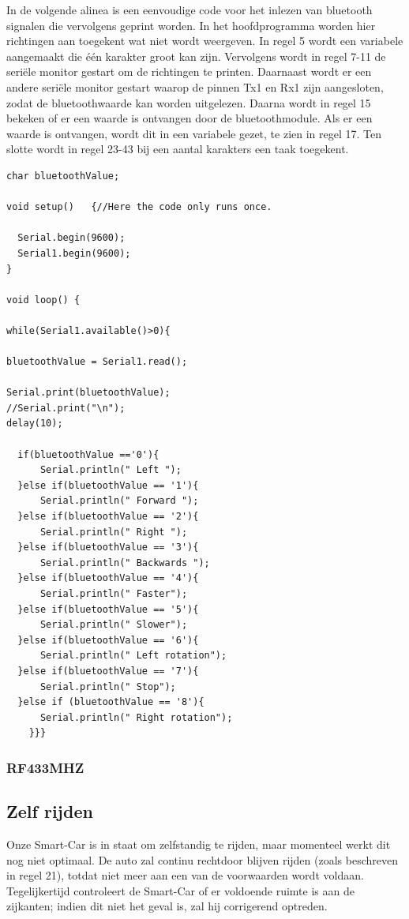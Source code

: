 In de volgende alinea is een eenvoudige code voor het inlezen van bluetooth signalen die vervolgens geprint worden. In het hoofdprogramma worden hier richtingen aan toegekent wat niet wordt weergeven. In regel 5 wordt een variabele aangemaakt die één karakter groot kan zijn. Vervolgens wordt in regel 7-11 de seriële monitor gestart om de richtingen te printen. Daarnaast wordt er een andere seriële monitor gestart waarop de pinnen Tx1 en Rx1 zijn aangesloten, zodat de bluetoothwaarde kan worden uitgelezen. Daarna wordt in regel 15 bekeken of er een waarde is ontvangen door de bluetoothmodule. Als er een waarde is ontvangen, wordt dit in een variabele gezet, te zien in regel 17. Ten slotte wordt in regel 23-43 bij een aantal karakters een taak toegekent.
\newpage
\begin{lstlisting}
char bluetoothValue;

void setup()   {//Here the code only runs once.
  
  Serial.begin(9600);
  Serial1.begin(9600);
}

void loop() {

while(Serial1.available()>0){ 
  
bluetoothValue = Serial1.read();

Serial.print(bluetoothValue);
//Serial.print("\n");
delay(10);

  if(bluetoothValue =='0'){
      Serial.println(" Left ");
  }else if(bluetoothValue == '1'){
      Serial.println(" Forward ");
  }else if(bluetoothValue == '2'){
      Serial.println(" Right ");
  }else if(bluetoothValue == '3'){
      Serial.println(" Backwards ");
  }else if(bluetoothValue == '4'){
      Serial.println(" Faster");
  }else if(bluetoothValue == '5'){
      Serial.println(" Slower");
  }else if(bluetoothValue == '6'){
      Serial.println(" Left rotation");
  }else if(bluetoothValue == '7'){
      Serial.println(" Stop");
  }else if (bluetoothValue == '8'){
      Serial.println(" Right rotation"); 
    }}}
\end{lstlisting}
\subsubsection{RF433MHZ}

\subsection{Zelf rijden}
Onze \gls{Smart-Car} is in staat om zelfstandig te rijden, maar momenteel werkt dit nog niet optimaal. De auto zal continu rechtdoor blijven rijden (zoals beschreven in regel 21), totdat niet meer aan een van de voorwaarden wordt voldaan. Tegelijkertijd controleert de \gls{Smart-Car} of er voldoende ruimte is aan de zijkanten; indien dit niet het geval is, zal hij corrigerend optreden.

